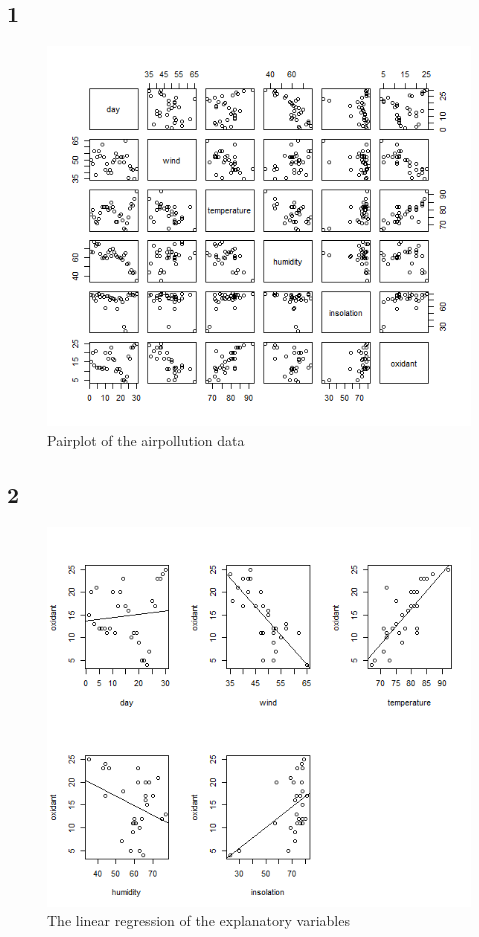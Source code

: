 \documentclass{article}
\begin{document}
    \subsection*{1}
      \begin{figure}[H]
          \centering
          \includegraphics[scale=0.6]{../results/2_1.png}
          \caption{Pairplot of the airpollution data}
          \label{fig:BoxHours}
      \end{figure} 
    \subsection*{2}
      \begin{figure}[H]
          \centering
          \includegraphics[scale=0.6]{../results/2_2.png}
          \caption{The linear regression of the explanatory variables}
          \label{fig:BoxHours}
      \end{figure} 
\end{document}
